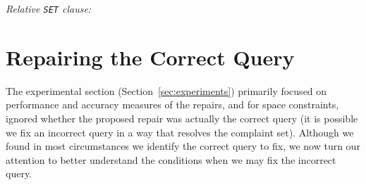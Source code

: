 \smallskip
\emph{Relative \texttt{SET} clause: } 


\section{Repairing the Correct Query}
\label{app:index}

The experimental section (Section~\ref{sec:experiments}) primarily focused on performance and accuracy measures of the repairs, and for space constraints, ignored 
whether the proposed repair was actually the correct query (it is possible we fix an incorrect query in a way that resolves the complaint set).
Although we found in most circumstances we identify the correct query to fix, we now turn our attention to better understand 
the conditions when we may fix the incorrect query. 

